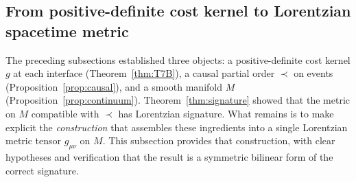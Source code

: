 \documentclass[11pt,a4paper]{article}
\theoremstyle{definition}
\begin{document}
\subsection{From positive-definite cost kernel to Lorentzian spacetime metric}
\label{sec:cost_to_lorentz}

The preceding subsections established three objects: a positive-definite
cost kernel $g$ at each interface (Theorem~\ref{thm:T7B}), a causal
partial order $\prec$ on events (Proposition~\ref{prop:causal}), and a
smooth manifold $M$ (Proposition~\ref{prop:continuum}).
Theorem~\ref{thm:signature} showed that the metric on $M$ compatible
with $\prec$ has Lorentzian signature.  What remains is to make explicit
the \emph{construction} that assembles these ingredients into a single
Lorentzian metric tensor $g_{\mu\nu}$ on $M$.  This subsection provides
that construction, with clear hypotheses and verification that the result
is a symmetric bilinear form of the correct signature.
\end{document}
